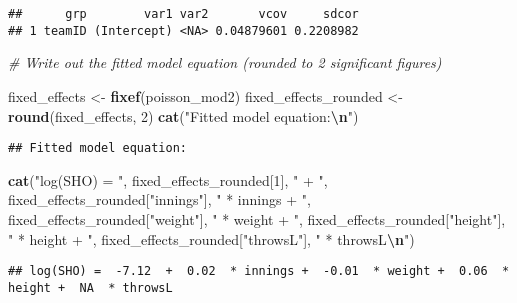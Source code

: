 \documentclass[
]{article}
\newenvironment{Shaded}{\begin{snugshade}}{\end{snugshade}}
\newcommand{\CommentTok}[1]{\textcolor[rgb]{0.56,0.35,0.01}{\textit{#1}}}
\newcommand{\DecValTok}[1]{\textcolor[rgb]{0.00,0.00,0.81}{#1}}
\newcommand{\FunctionTok}[1]{\textcolor[rgb]{0.13,0.29,0.53}{\textbf{#1}}}
\newcommand{\NormalTok}[1]{#1}
\newcommand{\OtherTok}[1]{\textcolor[rgb]{0.56,0.35,0.01}{#1}}
\newcommand{\SpecialCharTok}[1]{\textcolor[rgb]{0.81,0.36,0.00}{\textbf{#1}}}
\newcommand{\StringTok}[1]{\textcolor[rgb]{0.31,0.60,0.02}{#1}}
\begin{document}
\begin{verbatim}
##      grp        var1 var2       vcov     sdcor
## 1 teamID (Intercept) <NA> 0.04879601 0.2208982
\end{verbatim}

\begin{Shaded}
\begin{Highlighting}[]
\CommentTok{\# Write out the fitted model equation (rounded to 2 significant figures)}

\NormalTok{fixed\_effects }\OtherTok{\textless{}{-}} \FunctionTok{fixef}\NormalTok{(poisson\_mod2)}
\NormalTok{fixed\_effects\_rounded }\OtherTok{\textless{}{-}} \FunctionTok{round}\NormalTok{(fixed\_effects, }\DecValTok{2}\NormalTok{)}
\FunctionTok{cat}\NormalTok{(}\StringTok{"Fitted model equation:}\SpecialCharTok{\textbackslash{}n}\StringTok{"}\NormalTok{)}
\end{Highlighting}
\end{Shaded}

\begin{verbatim}
## Fitted model equation:
\end{verbatim}

\begin{Shaded}
\begin{Highlighting}[]
\FunctionTok{cat}\NormalTok{(}\StringTok{"log(SHO) = "}\NormalTok{, }
\NormalTok{    fixed\_effects\_rounded[}\DecValTok{1}\NormalTok{], }\StringTok{" + "}\NormalTok{,}
\NormalTok{    fixed\_effects\_rounded[}\StringTok{"innings"}\NormalTok{], }\StringTok{" * innings + "}\NormalTok{,}
\NormalTok{    fixed\_effects\_rounded[}\StringTok{"weight"}\NormalTok{], }\StringTok{" * weight + "}\NormalTok{,}
\NormalTok{    fixed\_effects\_rounded[}\StringTok{"height"}\NormalTok{], }\StringTok{" * height + "}\NormalTok{,}
\NormalTok{    fixed\_effects\_rounded[}\StringTok{"throwsL"}\NormalTok{], }\StringTok{" * throwsL}\SpecialCharTok{\textbackslash{}n}\StringTok{"}\NormalTok{)}
\end{Highlighting}
\end{Shaded}

\begin{verbatim}
## log(SHO) =  -7.12  +  0.02  * innings +  -0.01  * weight +  0.06  * height +  NA  * throwsL
\end{verbatim}

\begin{Shaded}
\end{Shaded}
\end{document}
